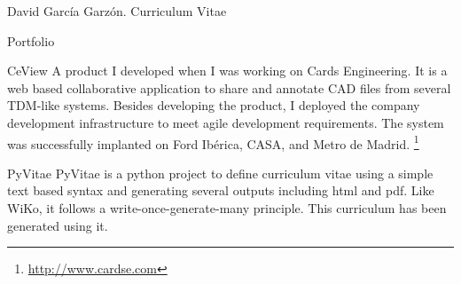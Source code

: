\documentclass{article}
\begin{document}
\begin{cv}{David García Garzón. Curriculum Vitae}
\begin{cvlist}{Portfolio}
\item[CeView]
A product I developed when I was working on Cards Engineering. It is a web based collaborative application to share and annotate CAD files from several TDM-like systems. Besides developing the product, I deployed the company development infrastructure to meet agile development requirements. The system was successfully implanted on Ford Ibérica, CASA, and Metro de Madrid. 
\footnote{\href{http://www.cardse.com}{http://www.cardse.com}}
\item[PyVitae]
PyVitae is a python project to define curriculum vitae using a simple text based syntax and generating several outputs including html and pdf. Like WiKo, it follows a write-once-generate-many principle. This curriculum has been generated using it.

\end{cvlist}


\vspace{2cm}

\end{cv}
\end{document}
